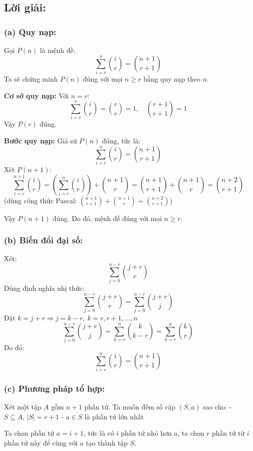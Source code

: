 \documentclass{article}
\begin{document}
	\subsection*{Lời giải:}
	
	\subsubsection*{(a) Quy nạp:}
	Gọi $P(n)$ là mệnh đề:
	\[
	\sum_{i=r}^n \binom{i}{r} = \binom{n + 1}{r + 1}
	\]
	Ta sẽ chứng minh $P(n)$ đúng với mọi $n \ge r$ bằng quy nạp theo $n$.
	
	\textbf{Cơ sở quy nạp:} Với $n = r$:
	\[
	\sum_{i=r}^r \binom{i}{r} = \binom{r}{r} = 1,\quad \binom{r + 1}{r + 1} = 1
	\]
	Vậy $P(r)$ đúng.
	
	\textbf{Bước quy nạp:} Giả sử $P(n)$ đúng, tức là:
	\[
	\sum_{i=r}^n \binom{i}{r} = \binom{n + 1}{r + 1}
	\]
	Xét $P(n + 1)$:
	\[
	\sum_{i=r}^{n + 1} \binom{i}{r} = \left( \sum_{i=r}^n \binom{i}{r} \right) + \binom{n + 1}{r}
	= \binom{n + 1}{r + 1} + \binom{n + 1}{r} = \binom{n + 2}{r + 1}
	\]
	(dùng công thức Pascal: $\binom{n+1}{r+1} + \binom{n+1}{r} = \binom{n+2}{r+1}$)
	
	Vậy $P(n+1)$ đúng. Do đó, mệnh đề đúng với mọi $n \ge r$.
	
	\subsubsection*{(b) Biến đổi đại số:}
	
	Xét:
	\[
	\sum_{j=0}^{n - r} \binom{j + r}{r}
	\]
	Dùng định nghĩa nhị thức:
	\[
	\sum_{j=0}^{n - r} \binom{j + r}{r} = \sum_{j=0}^{n - r} \binom{j + r}{j}
	\]
	Đặt $k = j + r \Rightarrow j = k - r,\ k = r, r + 1, \ldots, n$
	\[
	\sum_{j=0}^{n - r} \binom{j + r}{j} = \sum_{k=r}^{n} \binom{k}{k - r} = \sum_{k=r}^{n} \binom{k}{r}
	\]
	Do đó:
	\[
	\sum_{i=r}^{n} \binom{i}{r} = \binom{n + 1}{r + 1}
	\]
	
	\subsubsection*{(c) Phương pháp tổ hợp:}
	
	Xét một tập $A$ gồm $n + 1$ phần tử. Ta muốn đếm số cặp $(S, a)$ sao cho:
	- $S \subseteq A$, $|S| = r + 1$
	- $a \in S$ là phần tử lớn nhất
	
	Ta chọn phần tử $a = i + 1$, tức là có $i$ phần tử nhỏ hơn $a$, ta chọn $r$ phần tử từ $i$ phần tử này để cùng với $a$ tạo thành tập $S$.
	
\end{document}
